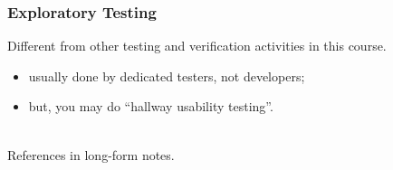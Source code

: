 \documentclass{beamer}
\newenvironment{changemargin}[1]{%
  \begin{list}{}{%
    \setlength{\topsep}{0pt}%
    \setlength{\leftmargin}{#1}%
    \setlength{\rightmargin}{1em}
    \setlength{\listparindent}{\parindent}%
    \setlength{\itemindent}{\parindent}%
    \setlength{\parsep}{\parskip}%
  }%
  \item[]}{\end{list}}
\begin{document}
\begin{frame}
  \frametitle{Exploratory Testing}
  \begin{changemargin}{2em}
    \Large
    Different from other testing and verification activities in this course.
    \begin{itemize}
    \item usually done by dedicated testers, not developers;
      \item but, you may do ``hallway usability testing''.
    \end{itemize}

    ~\\[0.5em]
    References in long-form notes.
  \end{changemargin}
\end{frame}
\end{document}
